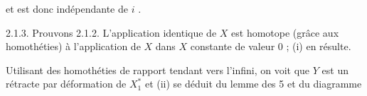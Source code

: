 \begin{center}
\end{center}


 et est donc indépendante de $i$ .

2.1.3. Prouvons 2.1.2. L'application identique de $X$ est homotope (grâce aux homothéties) à l'application de $X$ dans $X$ constante de valeur $0$ ; (i) en résulte.

Utilisant des homothéties de rapport tendant vers l'infini, on voit que $Y$ est un rétracte par déformation de $X_1^*$ et (ii) se déduit du lemme des 5 et du diagramme

